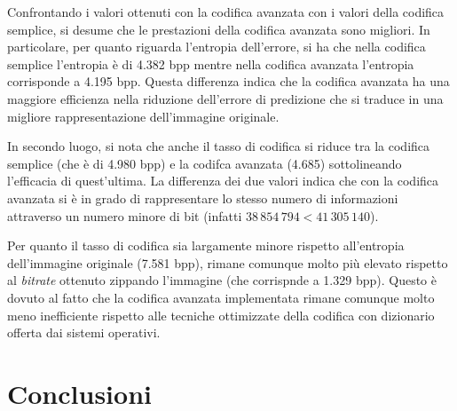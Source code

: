 Confrontando i valori ottenuti con la codifica avanzata con i valori della codifica semplice, si desume che le prestazioni della codifica avanzata sono migliori. In particolare, per quanto riguarda l'entropia dell'errore, si ha che nella codifica semplice l'entropia è di 4.382 bpp mentre nella codifica avanzata l'entropia corrisponde a 4.195 bpp. Questa differenza indica che la codifica avanzata ha una maggiore efficienza nella riduzione dell'errore di predizione che si traduce in una migliore rappresentazione dell'immagine originale.

In secondo luogo, si nota che anche il tasso di codifica si riduce tra la codifica semplice (che è di 4.980 bpp) e la codifca avanzata (4.685) sottolineando l'efficacia di quest'ultima. La differenza dei due valori indica che con la codifica avanzata si è in grado di rappresentare lo stesso numero di informazioni attraverso un numero minore di bit (infatti $38\,854\,794 < 41\,305\,140$).

Per quanto il tasso di codifica sia largamente minore rispetto all'entropia dell'immagine originale (7.581 bpp), rimane comunque molto più elevato rispetto al \textsl{bitrate} ottenuto zippando l'immagine (che corrispnde a 1.329 bpp). Questo è dovuto al fatto che la codifica avanzata implementata rimane comunque molto meno inefficiente rispetto alle tecniche ottimizzate della codifica con dizionario offerta dai sistemi operativi.






\vspace{15px}\section{Conclusioni}





